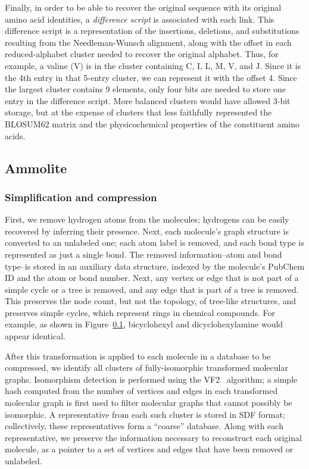 \documentclass[review,preprint,12pt]{elsarticle}
\theoremstyle{definition}
\theoremstyle{remark}
\numberwithin{equation}{section}
\begin{document}
Finally, in order to be able to recover the original sequence with its original
amino acid identities, a \textit{difference script} is associated with each
link.
This difference script is a representation of the insertions, deletions, and
substitutions resulting from the Needleman-Wunsch alignment, along with the
offset in each reduced-alphabet cluster needed to recover the original alphabet.
Thus, for example, a valine (V) is in the cluster containing C, I, L, M, V, and 
J.
Since it is the 4th entry in that 5-entry cluster, we can represent it with
the offset 4.
Since the largest cluster contains 9 elements, only four bits are needed to
store one entry in the difference script.
More balanced clusters would have allowed 3-bit storage, but at the expense of
clusters that less faithfully represented the BLOSUM62 matrix and the
physicochemical properties of the constituent amino acids.

\subsection{Ammolite}

\subsubsection*{Simplification and compression}

First, we remove hydrogen atoms from the molecules; hydrogens can be easily recovered by inferring their 
presence.
Next, each molecule's graph structure is converted to an unlabeled one; each atom label is removed, and each
bond type is represented as just a single bond.
The removed information--atom and bond type--is stored in an auxiliary data structure, indexed by the molecule's
PubChem ID and the atom or bond number.
Next, any vertex or edge that is not part of a simple cycle or a tree is removed, and any edge that is part
of a tree is removed.
This preserves the node count, but not the topology, of tree-like structures, and preserves simple cycles,
which represent rings in chemical compounds.
For example, as shown in Figure~\ref{}, bicyclohexyl and dicyclohexylamine would appear identical.

After this transformation is applied to each molecule in a database to be compressed, we identify all clusters
of fully-isomorphic transformed molecular graphs.
Isomorphism detection is performed using the VF2~\cite{Cordella} algorithm; a simple hash computed from the
number of vertices and edges in each transformed molecular graph is first used to filter molecular graphs that
cannot possibly be isomorphic.
A representative from each such cluster is stored in SDF format; collectively, these representatives form a 
``coarse'' database.
Along with each representative, we preserve the information necessary to reconstruct each original molecule,
as a pointer to a set of vertices and edges that have been removed or unlabeled.
\end{document}
